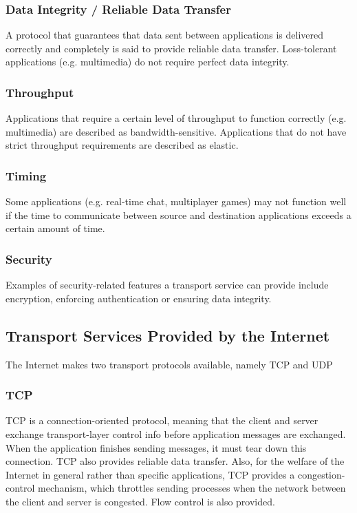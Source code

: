 \documentclass[12pt,titlepage]{article}
\begin{document}
      \subsubsection{Data Integrity / Reliable Data Transfer}
        A protocol that guarantees that data sent between applications is delivered correctly and completely is said to provide reliable data transfer. Loss-tolerant applications
        (e.g. multimedia) do not require perfect data integrity.

      \subsubsection{Throughput}
        Applications that require a certain level of throughput to function correctly (e.g. multimedia) are described as bandwidth-sensitive. Applications that do not have strict
        throughput requirements are described as elastic.

      \subsubsection{Timing}
        Some applications (e.g. real-time chat, multiplayer games) may not function well if the time to communicate between source and destination applications exceeds a certain
        amount of time.

      \subsubsection{Security}
        Examples of security-related features a transport service can provide include encryption, enforcing authentication or ensuring data integrity.

    \subsection{Transport Services Provided by the Internet}
      The Internet makes two transport protocols available, namely TCP and UDP

      \subsubsection{TCP}
        TCP is a connection-oriented protocol, meaning that the client and server exchange transport-layer control info before application messages are exchanged. When the
        application finishes sending messages, it must tear down this connection. TCP also provides reliable data transfer. Also, for the welfare of the Internet in general
        rather than specific applications, TCP provides a congestion-control mechanism, which throttles sending processes when the network between the client and server
        is congested. Flow control is also provided.
\end{document}
